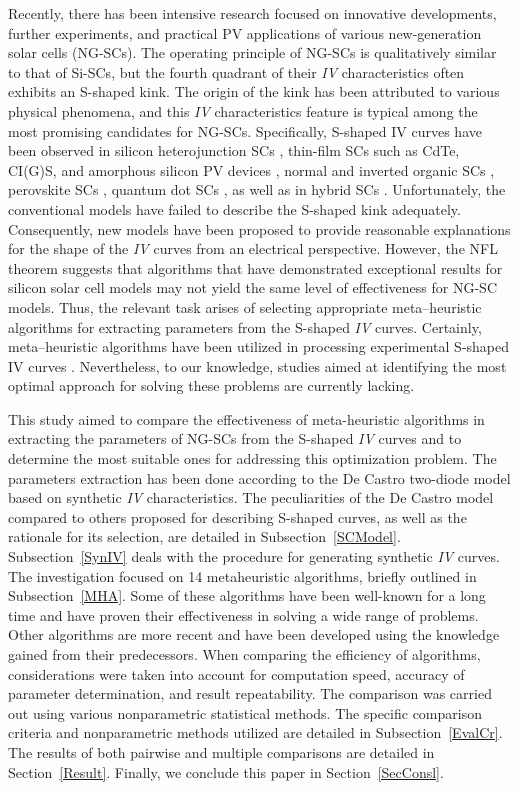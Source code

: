 \documentclass[a4paper,fleqn]{cas-sc}
\begin{document}
Recently, there has been intensive research focused on innovative developments,
further experiments, and practical PV applications of various new-generation solar cells (NG-SCs).
The operating principle of NG-SCs is qualitatively similar to that of Si-SCs,
but the fourth quadrant of their \emph{IV} characteristics often exhibits an S-shaped kink.
The origin of the kink has been attributed to various physical phenomena,
and this \emph{IV} characteristics feature is typical among the most promising candidates for NG-SCs.
Specifically, S-shaped IV curves have been observed in silicon heterojunction SCs \cite{Saive2019},
thin-film SCs such as CdTe, CI(G)S, and amorphous silicon PV devices \cite{Saive2019,Roland2016},
normal and inverted organic SCs \cite{Gaur2014,Tran2017,Lastra2019},
perovskite SCs \cite{Saive2019,Xu2016},
quantum dot SCs \cite{Gao2011,Yu2019a},
as well as in hybrid SCs \cite{VeinbergVidal2016,Romero2017,Finck2013}.
Unfortunately, the conventional models have failed to describe the S-shaped kink adequately.
Consequently, new models have been proposed to provide reasonable explanations for the shape of the \emph{IV} curves from an electrical perspective.
However, the NFL theorem suggests that algorithms that have demonstrated exceptional results
for silicon solar cell models may not yield the same level of effectiveness for NG-SC models.
Thus, the relevant task arises of selecting appropriate meta--heuristic algorithms for extracting
parameters from the S-shaped \emph{IV} curves.
Certainly, meta--heuristic algorithms have been utilized in processing experimental S-shaped IV curves \cite{Pillai2017}.
Nevertheless, to our knowledge, studies aimed at identifying the most optimal approach for solving these problems are currently lacking.

This study aimed to compare the effectiveness of meta-heuristic algorithms in extracting the parameters of NG-SCs from the S-shaped \emph{IV} curves
and to determine the most suitable ones for addressing this optimization problem.
The parameters extraction has been done according to the De Castro two-diode model based on synthetic \emph{IV} characteristics.
The peculiarities of the De Castro model compared to others proposed for describing S-shaped curves,
as well as the rationale for its selection, are detailed in Subsection~\ref{SCModel}.
Subsection~\ref{SynIV} deals with the procedure for generating synthetic \emph{IV} curves.
The investigation focused on 14 metaheuristic algorithms, briefly outlined in Subsection~\ref{MHA}.
Some of these algorithms have been well-known for a long time and have proven their effectiveness in solving a wide range of problems.
Other algorithms are more recent and have been developed using the knowledge gained from their predecessors.
When comparing the efficiency of algorithms, considerations were taken into account for computation speed, accuracy of parameter determination, and result repeatability.
The comparison was carried out using various nonparametric statistical methods.
The specific comparison criteria and nonparametric methods utilized are detailed in Subsection~\ref{EvalCr}.
The results of both pairwise and multiple comparisons are detailed in Section~\ref{Result}.
Finally, we conclude this paper in Section~\ref{SecConsl}.
\end{document}
